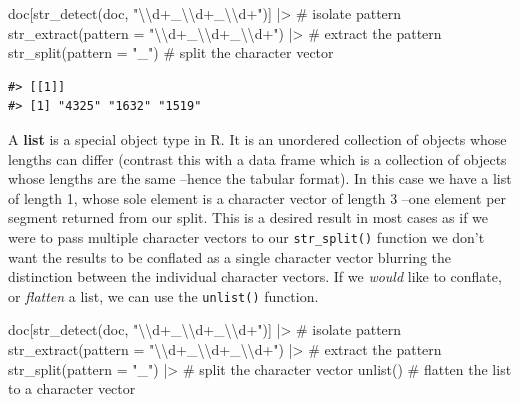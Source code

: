 \documentclass[
  letterpaper,
]{latex/krantz}
\newenvironment{Shaded}{\begin{snugshade}}{\end{snugshade}}
\newcommand{\AttributeTok}[1]{\textcolor[rgb]{0.40,0.45,0.13}{#1}}
\newcommand{\CommentTok}[1]{\textcolor[rgb]{0.37,0.37,0.37}{#1}}
\newcommand{\FunctionTok}[1]{\textcolor[rgb]{0.28,0.35,0.67}{#1}}
\newcommand{\NormalTok}[1]{\textcolor[rgb]{0.00,0.23,0.31}{#1}}
\newcommand{\SpecialCharTok}[1]{\textcolor[rgb]{0.37,0.37,0.37}{#1}}
\newcommand{\StringTok}[1]{\textcolor[rgb]{0.13,0.47,0.30}{#1}}
\begin{document}
\begin{Shaded}
\begin{Highlighting}[]
\NormalTok{doc[}\FunctionTok{str\_detect}\NormalTok{(doc, }\StringTok{"}\SpecialCharTok{\textbackslash{}\textbackslash{}}\StringTok{d+\_}\SpecialCharTok{\textbackslash{}\textbackslash{}}\StringTok{d+\_}\SpecialCharTok{\textbackslash{}\textbackslash{}}\StringTok{d+"}\NormalTok{)] }\SpecialCharTok{|\textgreater{}} \CommentTok{\# isolate pattern}
  \FunctionTok{str\_extract}\NormalTok{(}\AttributeTok{pattern =} \StringTok{"}\SpecialCharTok{\textbackslash{}\textbackslash{}}\StringTok{d+\_}\SpecialCharTok{\textbackslash{}\textbackslash{}}\StringTok{d+\_}\SpecialCharTok{\textbackslash{}\textbackslash{}}\StringTok{d+"}\NormalTok{) }\SpecialCharTok{|\textgreater{}} \CommentTok{\# extract the pattern}
  \FunctionTok{str\_split}\NormalTok{(}\AttributeTok{pattern =} \StringTok{"\_"}\NormalTok{) }\CommentTok{\# split the character vector}
\end{Highlighting}
\end{Shaded}

\begin{verbatim}
#> [[1]]
#> [1] "4325" "1632" "1519"
\end{verbatim}

A \textbf{list} is a special object type in R. It is an unordered
collection of objects whose lengths can differ (contrast this with a
data frame which is a collection of objects whose lengths are the same
--hence the tabular format). In this case we have a list of length 1,
whose sole element is a character vector of length 3 --one element per
segment returned from our split. This is a desired result in most cases
as if we were to pass multiple character vectors to our
\texttt{str\_split()} function we don't want the results to be conflated
as a single character vector blurring the distinction between the
individual character vectors. If we \emph{would} like to conflate, or
\emph{flatten} a list, we can use the \texttt{unlist()} function.

\begin{Shaded}
\begin{Highlighting}[]
\NormalTok{doc[}\FunctionTok{str\_detect}\NormalTok{(doc, }\StringTok{"}\SpecialCharTok{\textbackslash{}\textbackslash{}}\StringTok{d+\_}\SpecialCharTok{\textbackslash{}\textbackslash{}}\StringTok{d+\_}\SpecialCharTok{\textbackslash{}\textbackslash{}}\StringTok{d+"}\NormalTok{)] }\SpecialCharTok{|\textgreater{}} \CommentTok{\# isolate pattern}
  \FunctionTok{str\_extract}\NormalTok{(}\AttributeTok{pattern =} \StringTok{"}\SpecialCharTok{\textbackslash{}\textbackslash{}}\StringTok{d+\_}\SpecialCharTok{\textbackslash{}\textbackslash{}}\StringTok{d+\_}\SpecialCharTok{\textbackslash{}\textbackslash{}}\StringTok{d+"}\NormalTok{) }\SpecialCharTok{|\textgreater{}} \CommentTok{\# extract the pattern}
  \FunctionTok{str\_split}\NormalTok{(}\AttributeTok{pattern =} \StringTok{"\_"}\NormalTok{) }\SpecialCharTok{|\textgreater{}} \CommentTok{\# split the character vector}
  \FunctionTok{unlist}\NormalTok{() }\CommentTok{\# flatten the list to a character vector}
\end{Highlighting}
\end{Shaded}
\end{document}
